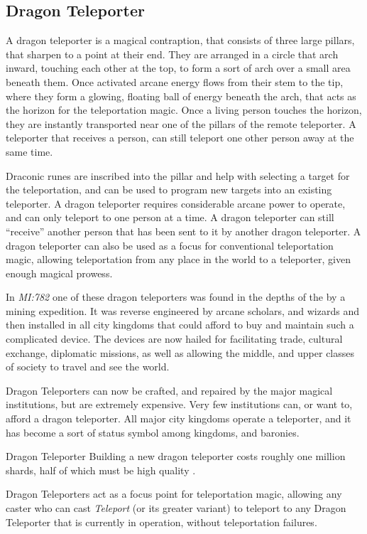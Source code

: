 \ifimages
\clearpage
{}
\clearpage
\fi


\subsection{Dragon Teleporter}
\label{sec:Dragon Teleporter}

A dragon teleporter is a magical contraption, that consists of three large
pillars, that sharpen to a point at their end. They are arranged in a circle
that arch inward, touching each other at the top, to form a sort of arch over
a small area beneath them. Once activated arcane energy flows from their stem
to the tip, where they form a glowing, floating ball of energy beneath the
arch, that acts as the horizon for the teleportation magic. Once a living
person touches the horizon, they are instantly transported near one of the
pillars of the remote teleporter. A teleporter that receives a person, can
still teleport one other person away at the same time.

Draconic runes are inscribed into the pillar and help with selecting a target
for the teleportation, and can be used to program new targets into an existing
teleporter. A dragon teleporter requires considerable arcane power to operate,
and can only teleport to one person at a time. A dragon teleporter can still
``receive'' another person that has been sent to it by another dragon
teleporter. A dragon teleporter can also be used as a focus for conventional
teleportation magic, allowing teleportation from any place in the world to
a teleporter, given enough magical prowess.

In \emph{MI:782} one of these dragon teleporters was found in the depths of
the  by a mining expedition. It was reverse
engineered by arcane scholars, and wizards and then installed in all city
kingdoms that could afford to buy and maintain such a complicated device.
The devices are now hailed for facilitating trade, cultural exchange,
diplomatic missions, as well as allowing the middle, and upper classes of
society to travel and see the world.

Dragon Teleporters can now be crafted, and repaired by the major magical
institutions, but are extremely expensive. Very few institutions can, or want
to, afford a dragon teleporter. All major city kingdoms operate a teleporter,
and it has become a sort of status symbol among kingdoms, and baronies.

\begin{35e}{Dragon Teleporter}
  Building a new dragon teleporter costs roughly one million shards, half of
  which must be high quality .

  Dragon Teleporters act as a focus point for teleportation magic, allowing
  any caster who can cast \emph{Teleport} (or its greater variant) to teleport
  to any Dragon Teleporter that is currently in operation, without
  teleportation failures.
\end{35e}
